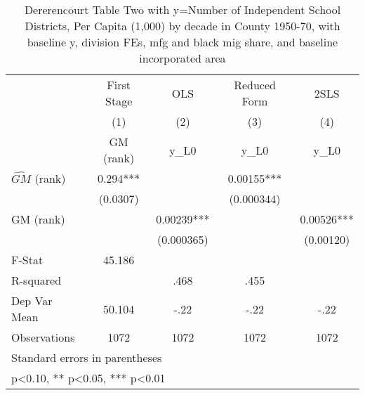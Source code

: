 \begin{table}[htbp]\centering
\def\sym#1{\ifmmode^{#1}\else\(^{#1}\)\fi}
\caption{Dererencourt Table Two with y=Number of Independent School Districts, Per Capita (1,000) by decade in County 1950-70, with baseline y, division FEs, mfg and black mig share, and baseline incorporated area}
\begin{tabular}{l*{4}{c}}
\toprule
                    & First Stage   &         OLS   &Reduced Form   &        2SLS   \\
                    &\multicolumn{1}{c}{(1)}&\multicolumn{1}{c}{(2)}&\multicolumn{1}{c}{(3)}&\multicolumn{1}{c}{(4)}\\
                    &\multicolumn{1}{c}{GM  (rank)}&\multicolumn{1}{c}{y\_L0}&\multicolumn{1}{c}{y\_L0}&\multicolumn{1}{c}{y\_L0}\\
\midrule
$\hat{GM}$ (rank)   &       0.294***&               &     0.00155***&               \\
                    &    (0.0307)   &               &  (0.000344)   &               \\
\addlinespace
GM  (rank)          &               &     0.00239***&               &     0.00526***\\
                    &               &  (0.000365)   &               &   (0.00120)   \\
\midrule
F-Stat              &      45.186   &               &               &               \\
R-squared           &               &        .468   &        .455   &               \\
Dep Var Mean        &      50.104   &        -.22   &        -.22   &        -.22   \\
Observations        &        1072   &        1072   &        1072   &        1072   \\
\bottomrule
\multicolumn{5}{l}{\footnotesize Standard errors in parentheses}\\
\multicolumn{5}{l}{\footnotesize * p<0.10, ** p<0.05, *** p<0.01}\\
\end{tabular}
\end{table}
